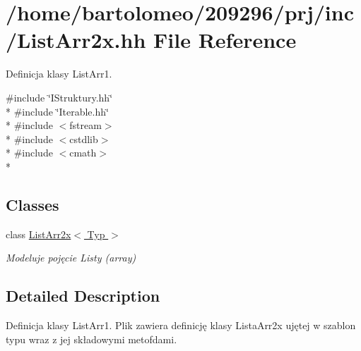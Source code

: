 \hypertarget{_list_arr2x_8hh}{\section{/home/bartolomeo/209296/prj/inc/\-List\-Arr2x.hh File Reference}
\label{_list_arr2x_8hh}
}


Definicja klasy List\-Arr1.  


{\ttfamily \#include \char`\"{}I\-Struktury.\-hh\char`\"{}}\\*
{\ttfamily \#include \char`\"{}Iterable.\-hh\char`\"{}}\\*
{\ttfamily \#include $<$fstream$>$}\\*
{\ttfamily \#include $<$cstdlib$>$}\\*
{\ttfamily \#include $<$cmath$>$}\\*
\subsection*{Classes}
\begin{DoxyCompactItemize}
\item 
class \hyperlink{class_list_arr2x}{List\-Arr2x$<$ Typ $>$}
\begin{DoxyCompactList}\small\item\em Modeluje pojęcie Listy (array) \end{DoxyCompactList}\end{DoxyCompactItemize}


\subsection{Detailed Description}
Definicja klasy List\-Arr1. Plik zawiera definicję klasy Lista\-Arr2x ujętej w szablon typu wraz z jej składowymi metofdami. 